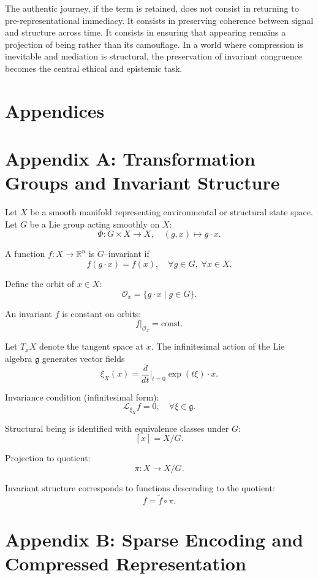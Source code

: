 \documentclass[11pt]{article}
\begin{document}
The authentic journey, if the term is retained, does not consist in returning to pre-representational immediacy. It consists in preserving coherence between signal and structure across time. It consists in ensuring that appearing remains a projection of being rather than its camouflage. In a world where compression is inevitable and mediation is structural, the preservation of invariant congruence becomes the central ethical and epistemic task.


\newpage
\section*{Appendices}

\appendix

\section{Appendix A: Transformation Groups and Invariant Structure}

Let $X$ be a smooth manifold representing environmental or structural state space. Let $G$ be a Lie group acting smoothly on $X$:
\[
\Phi : G \times X \to X, \quad (g,x) \mapsto g \cdot x.
\]

A function $f : X \to \mathbb{R}^n$ is $G$–invariant if
\[
f(g \cdot x) = f(x), \quad \forall g \in G, \; \forall x \in X.
\]

Define the orbit of $x \in X$:
\[
\mathcal{O}_x = \{ g \cdot x \mid g \in G \}.
\]

An invariant $f$ is constant on orbits:
\[
f|_{\mathcal{O}_x} = \text{const}.
\]

Let $T_xX$ denote the tangent space at $x$. The infinitesimal action of the Lie algebra $\mathfrak{g}$ generates vector fields
\[
\xi_X(x) = \frac{d}{dt}\bigg|_{t=0} \exp(t\xi) \cdot x.
\]

Invariance condition (infinitesimal form):
\[
\mathcal{L}_{\xi_X} f = 0, \quad \forall \xi \in \mathfrak{g}.
\]

Structural being is identified with equivalence classes under $G$:
\[
[x] = X / G.
\]

Projection to quotient:
\[
\pi : X \to X/G.
\]

Invariant structure corresponds to functions descending to the quotient:
\[
f = \tilde{f} \circ \pi.
\]

\section{Appendix B: Sparse Encoding and Compressed Representation}
\end{document}
